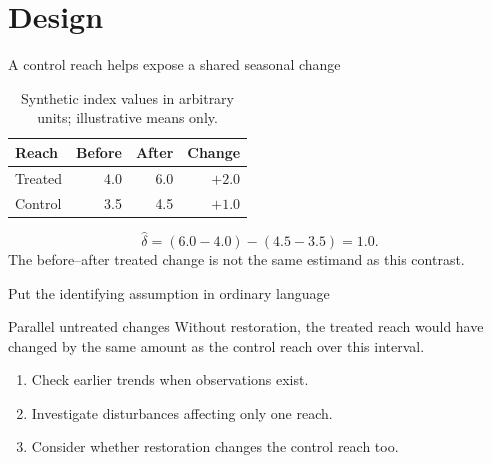 \documentclass[11pt,aspectratio=169]{beamer}
\begin{document}
\section{Design}
\begin{frame}{A control reach helps expose a shared seasonal change}
\begin{table}\centering
\begin{tabular}{lrrr}\toprule
Reach & Before & After & Change\\\midrule
Treated & 4.0 & 6.0 & $+2.0$\\
Control & 3.5 & 4.5 & $+1.0$\\\bottomrule
\end{tabular}
\caption{Synthetic index values in arbitrary units; illustrative means only.}
\end{table}
\pause
\[
 \widehat\delta=(6.0-4.0)-(4.5-3.5)=1.0.
\]
The before--after treated change is not the same estimand as this contrast.
\end{frame}
\begin{frame}{Put the identifying assumption in ordinary language}
\begin{alertblock}{Parallel untreated changes}
Without restoration, the treated reach would have changed by the same amount as the control reach over this interval.
\end{alertblock}
\begin{enumerate}
\item Check earlier trends when observations exist.
\item Investigate disturbances affecting only one reach.
\item Consider whether restoration changes the control reach too.
\end{enumerate}
\end{frame}
\end{document}
